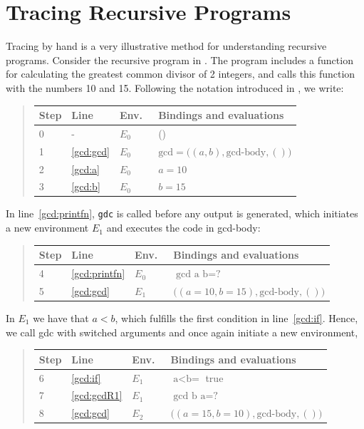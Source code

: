 \documentclass[fsharpNotes.tex]{subfiles}
\begin{document}
\section{Tracing Recursive Programs}
\label{sec:recursiveTracing}
Tracing by hand is a very illustrative method for understanding recursive programs. Consider the recursive program in .
%
%
The program includes a function for calculating the greatest common divisor of 2 integers, and calls this function with the numbers 10 and 15. Following the notation introduced in , we write:
\begin{quote}
  \begin{tabular*}{0.6\linewidth}{l|lll}
    Step & Line & Env.\ & Bindings and evaluations\\
    \hline
    0 & - & $E_0$ & ()\\
    1 &\ref{gcd:gcd} & $E_0$ & $\text{gcd} = \big((a, b), \text{gcd-body}, ()\big)$\\
    2 &\ref{gcd:a} & $E_0$ & $a = 10$\\
    3 &\ref{gcd:b} & $E_0$ & $b = 15$\\
  \end{tabular*}
\end{quote}
In line~\ref{gcd:printfn}, \lstinline!gdc! is called before any output is generated, which initiates a new environment $E_1$ and executes the code in gcd-body:
\begin{quote}
  \begin{tabular*}{0.6\linewidth}{l|lll}
    Step & Line & Env.\ & Bindings and evaluations\\
    \hline
  4 & \ref{gcd:printfn} & $E_0$ & $\text{gcd a b} = \text{?}$\\
  5 & \ref{gcd:gcd} & $E_1$ & $\big((a = 10, b =15), \text{gcd-body}, ()\big)$\\
  \end{tabular*}
\end{quote}
 In $E_1$ we have that $a<b$, which fulfills the first condition in line~\ref{gcd:if}. Hence, we call gdc with switched arguments and once again initiate a new environment,
\begin{quote}
  \begin{tabular*}{0.6\linewidth}{l|lll}
    Step & Line & Env.\ & Bindings and evaluations\\
    \hline
  6&\ref{gcd:if} & $E_1$ &$\text{a<b} =$ true\\
  7&\ref{gcd:gcdR1} & $E_1$ &$\text{gcd b a} = \text{?}$\\
  8 &\ref{gcd:gcd} & $E_2$ & $\big((a = 15, b = 10), \text{gcd-body}, ()\big)$\\
  \end{tabular*}
\end{quote}
\end{document}
